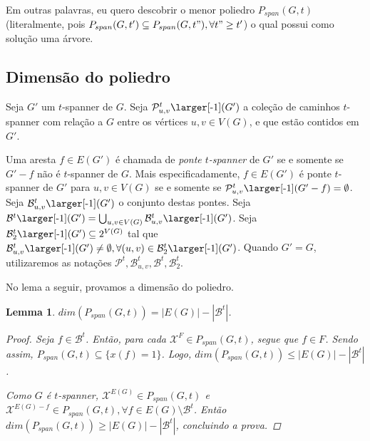 \documentclass[11pt,reqno]{amsart}
\newcommand{\smallGprime}{\mbox{\larger[-1]$(G')$}}
\newcommand{\smallGprimef}{\mbox{\larger[-1]$(G'-f)$}}
\newcommand{\spanPath}{\mathcal{P}}
\newcommand{\spanBridge}{\mathcal{B}}
\newcommand{\Pathuv}{\spanPath_{u,v}^{t}}
\newcommand{\Path}{\spanPath^{t}}
\newcommand{\PathuvGprime}{\Pathuv\smallGprime}
\newcommand{\PathuvGprimef}{\Pathuv\smallGprimef}
\newcommand{\Bridgeuv}{\spanBridge_{u,v}^{t}}
\newcommand{\Bridge}{\spanBridge^{t}}
\newcommand{\BridgeuvGprime}{\Bridgeuv\smallGprime}
\newcommand{\BridgeTwo}{\spanBridge_{2}^{t}}
\newcommand{\BridgeGprime}{\Bridge\smallGprime}
\newcommand{\BridgeTwoGprime}{\BridgeTwo\smallGprime}
\newtheorem{lema}{Lemma}
\newcommand{\incid}{\mathcal{X}}
\begin{document}
Em outras palavras, eu quero descobrir o menor poliedro $P_{span}(G,t)$ (literalmente, 
pois $P_{span}(G,t') \subseteq P_{span}(G,t"), \forall t" \ge t'$) o qual possui 
como solução uma árvore.


\subsection{Dimensão do poliedro}
Seja $G'$ um $t$-spanner de $G$. 
Seja $\PathuvGprime$ a coleção de caminhos $t$-spanner 
com relação a $G$ entre os vértices $u,v \in V(G)$, e que estão contidos em 
$G'$.

Uma aresta $f \in E(G')$ é chamada de 
\emph{ponte $t$-spanner} de $G'$ se e somente se $G'-f$ não é $t$-spanner 
de $G$. Mais especificadamente, $f \in E(G')$ é ponte $t$-spanner de $G'$ para 
$u,v \in V(G)$ 
se e somente se $\PathuvGprimef = \emptyset$. 
Seja $\BridgeuvGprime$ o conjunto destas pontes. 
Seja \mbox{$\BridgeGprime = \bigcup_{u,v \in V(G)} \BridgeuvGprime$}. 
Seja $\BridgeTwoGprime \subseteq 2^{V(G)}$ tal que 
$\BridgeuvGprime \neq \emptyset, \forall (u,v) \in \BridgeTwoGprime$. 
Quando $G' = G$, 
utilizaremos as notações $\Path, \Bridgeuv, \Bridge, \BridgeTwo$. 

No lema a seguir, provamos a dimensão do poliedro.

\begin{lema}
$dim(P_{span}(G,t)) = |E(G)| - |\Bridge|$.
\begin{proof}
Seja $f \in \Bridge$. Então, para cada $\incid^{F} \in P_{span}(G,t)$, segue que 
$f \in F$. Sendo assim, $P_{span}(G,t) \subseteq \{x(f) = 1\}$. Logo, 
$dim(P_{span}(G,t)) \le |E(G)| - |\Bridge|$.

Como $G$ é $t$-spanner, $\incid^{E(G)} \in P_{span}(G,t)$ e 
$\incid^{E(G)-f} \in P_{span}(G,t), \forall f \in E(G) \setminus \Bridge$. Então 
$dim(P_{span}(G,t)) \ge |E(G)| - |\Bridge|$, concluindo a prova.
\end{proof}
\end{lema}
\end{document}
